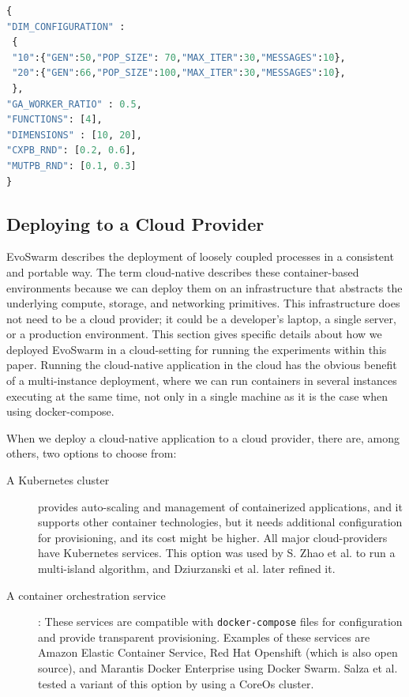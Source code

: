 \documentclass[review]{elsarticle}
\begin{document}
\begin{lstlisting}[language=Python, caption=Experiment definition example, label=code:exp]
{
"DIM_CONFIGURATION" : 
 {
 "10":{"GEN":50,"POP_SIZE": 70,"MAX_ITER":30,"MESSAGES":10},
 "20":{"GEN":66,"POP_SIZE":100,"MAX_ITER":30,"MESSAGES":10},
 },
"GA_WORKER_RATIO" : 0.5,
"FUNCTIONS": [4],
"DIMENSIONS" : [10, 20],
"CXPB_RND": [0.2, 0.6],
"MUTPB_RND": [0.1, 0.3]
}
\end{lstlisting}


\subsection{Deploying to a Cloud Provider}
\label{cloud-aws}

EvoSwarm describes the deployment of loosely coupled processes in a consistent
and portable way. The term cloud-native describes these container-based
environments because we can deploy them on an infrastructure that abstracts the
underlying compute, storage, and networking primitives. This infrastructure does
not need to be a cloud provider; it could be a developer's laptop, a single
server, or a production environment. This section gives specific details
about how we deployed EvoSwarm in a cloud-setting for running the experiments
within this paper. Running the cloud-native application in the cloud has the obvious
benefit of a multi-instance deployment, where we can run containers in several
instances executing at the same time, not only in a single machine as it is the case when using docker-compose. 

When we deploy a cloud-native application to a cloud provider, there
are, among others, two options to choose from:

\begin{description}
  
  \item[A Kubernetes cluster] provides auto-scaling and management of
  containerized applications, and it supports other container technologies, 
  but it needs additional configuration for provisioning, 
  and its cost might be higher. All major cloud-providers have Kubernetes services. This option
  was used by S. Zhao et al. \cite{zhao2019cloud} to run a multi-island
  algorithm, and Dziurzanski et al. \cite{dziurzanski2020scalable} later refined
  it.

  \item[A container orchestration service]: These services are compatible with {\tt docker-compose}
    files for configuration and provide transparent provisioning. Examples of these
    services are Amazon Elastic Container Service,  Red Hat Openshift
    (which is also open source), and Marantis Docker Enterprise using Docker Swarm.
    Salza et al. \cite{salza2019speed} tested a variant of this option by using a CoreOs cluster. 

\end{description}
\end{document}
